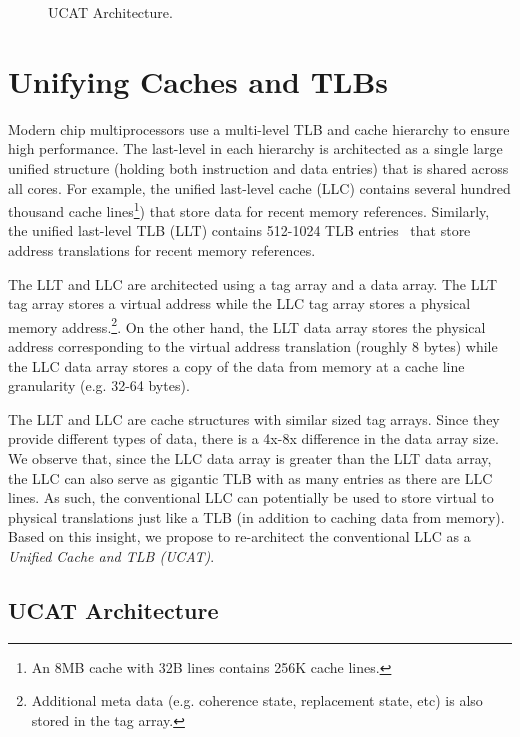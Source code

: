 \begin{figure*}[tp] 
\vspace{-0. in}
\centering
\centerline{}
\caption{\small UCAT Architecture. \normalsize}
\label{fig:pagetable_placement} 
\vspace{-0.0in}
\end{figure*}

\section{Unifying Caches and TLBs}
\label{sec:UCAT}

\noindent Modern chip multiprocessors use a multi-level TLB and cache
hierarchy to ensure high performance. The last-level in each hierarchy
is architected as a single large unified structure (holding both
instruction and data entries) that is shared across all cores. For
example, the unified last-level cache (LLC) contains several hundred
thousand cache lines\footnote{An 8MB cache with 32B lines contains
256K cache lines.}) that store data for recent memory references.
Similarly, the unified last-level TLB (LLT) contains 512-1024 TLB
entries~\cite{} that store address translations for recent memory
references.

The LLT and LLC are architected using a tag array and a data array.
The LLT tag array stores a virtual address while the LLC tag array
stores a physical memory address.\footnote{Additional meta data (e.g.
coherence state, replacement state, etc) is also stored in the tag
array.}. On the other hand, the LLT data array stores the physical
address corresponding to the virtual address translation (roughly 8
bytes) while the LLC data array stores a copy of the data from memory
at a cache line granularity (e.g. 32-64 bytes).

The LLT and LLC are cache structures with similar sized tag arrays.
Since they provide different types of data, there is a 4x-8x
difference in the data array size. We observe that, since the LLC data
array is greater than the LLT data array, the LLC can also serve as
gigantic TLB with as many entries as there are LLC lines. As such, the
conventional LLC can potentially be used to store virtual to physical
translations just like a TLB (in addition to caching data from
memory). Based on this insight, we propose to re-architect the
conventional LLC as a {\em Unified Cache and TLB (UCAT)}.

\subsection{UCAT Architecture}

